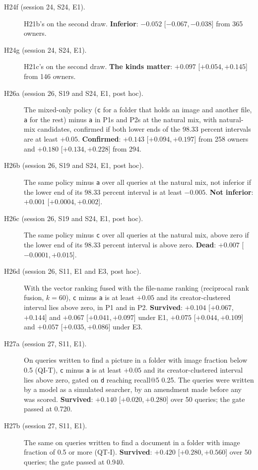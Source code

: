 \documentclass[11pt]{article}
\newcommand{\rep}[1]{\texttt{#1}}
\newcommand{\ci}[2]{[\ensuremath{#1},\,\ensuremath{#2}]}  %
\begin{document}
\begin{description}
\item[H24f (session 24, S24, E1).] H21b's on the second draw. \textbf{Inferior}: $-0.052$ \ci{-0.067}{-0.038} from 365 owners.
\item[H24g (session 24, S24, E1).] H21c's on the second draw. \textbf{The kinds matter}: $+0.097$ \ci{+0.054}{+0.145} from 146 owners.
\item[H26a (session 26, S19 and S24, E1, post hoc).] The mixed-only policy (\rep{c} for a folder that holds an image and another file, \rep{a} for the rest) minus \rep{a} in P1s and P2s at the natural mix, with natural-mix candidates, confirmed if both lower ends of the 98.33 percent intervals are at least $+0.05$. \textbf{Confirmed}: $+0.143$ \ci{+0.094}{+0.197} from 258 owners and $+0.180$ \ci{+0.134}{+0.228} from 294.
\item[H26b (session 26, S19 and S24, E1, post hoc).] The same policy minus \rep{a} over all queries at the natural mix, not inferior if the lower end of its 98.33 percent interval is at least $-0.005$. \textbf{Not inferior}: $+0.001$ \ci{+0.0004}{+0.002}.
\item[H26c (session 26, S19 and S24, E1, post hoc).] The same policy minus \rep{c} over all queries at the natural mix, above zero if the lower end of its 98.33 percent interval is above zero. \textbf{Dead}: $+0.007$ \ci{-0.0001}{+0.015}.
\item[H26d (session 26, S11, E1 and E3, post hoc).] With the vector ranking fused with the file-name ranking (reciprocal rank fusion, $k = 60$), \rep{c} minus \rep{a} is at least $+0.05$ and its creator-clustered interval lies above zero, in P1 and in P2. \textbf{Survived}: $+0.104$ \ci{+0.067}{+0.144} and $+0.067$ \ci{+0.041}{+0.097} under E1, $+0.075$ \ci{+0.044}{+0.109} and $+0.057$ \ci{+0.035}{+0.086} under E3.
\item[H27a (session 27, S11, E1).] On queries written to find a picture in a folder with image fraction below 0.5 (QI-T), \rep{c} minus \rep{a} is at least $+0.05$ and its creator-clustered interval lies above zero, gated on \rep{d} reaching recall@5 0.25. The queries were written by a model as a simulated searcher, by an amendment made before any was scored. \textbf{Survived}: $+0.140$ \ci{+0.020}{+0.280} over 50 queries; the gate passed at 0.720.
\item[H27b (session 27, S11, E1).] The same on queries written to find a document in a folder with image fraction of 0.5 or more (QT-I). \textbf{Survived}: $+0.420$ \ci{+0.280}{+0.560} over 50 queries; the gate passed at 0.940.

\end{description}
\end{document}
